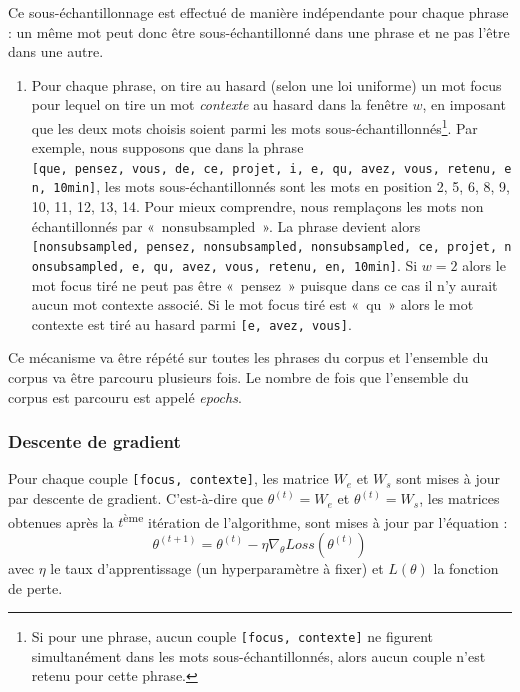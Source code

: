\documentclass[11pt,french,french]{article}
\providecommand{\tightlist}{%
  \setlength{\parskip}{0pt}
  }
\let\rmarkdownfootnote\footnote%
\def\footnote{\protect\rmarkdownfootnote}
\begin{document}
Ce sous-échantillonnage est effectué de manière indépendante pour chaque phrase : un même mot peut donc être sous-échantillonné dans une phrase et ne pas l'être dans une autre.

\begin{enumerate}
\def\labelenumi{\arabic{enumi}.}
\setcounter{enumi}{1}
\tightlist
\item
  Pour chaque phrase, on tire au hasard (selon une loi uniforme) un mot focus pour lequel on tire un mot \emph{contexte} au hasard dans la fenêtre \(w\), en imposant que les deux mots choisis soient parmi les mots sous-échantillonnés\footnote{Si pour une phrase, aucun couple \texttt{{[}focus,\ contexte{]}} ne figurent simultanément dans les mots sous-échantillonnés, alors aucun couple n'est retenu pour cette phrase.}.
  Par exemple, nous supposons que dans la phrase \texttt{{[}que,\ pensez,\ vous,\ de,\ ce,\ projet,\ i,\ e,\ qu,\ avez,\ vous,\ retenu,\ en,\ 10min{]}}, les mots sous-échantillonnés sont les mots en position 2, 5, 6, 8, 9, 10, 11, 12, 13, 14.
  Pour mieux comprendre, nous remplaçons les mots non échantillonnés par «~nonsubsampled~». La phrase devient alors \texttt{{[}nonsubsampled,\ pensez,\ nonsubsampled,\ nonsubsampled,\ ce,\ projet,\ nonsubsampled,\ e,\ qu,\ avez,\ vous,\ retenu,\ en,\ 10min{]}}.
  Si \(w=2\) alors le mot focus tiré ne peut pas être «~pensez~» puisque dans ce cas il n'y aurait aucun mot contexte associé. Si le mot focus tiré est «~qu~» alors le mot contexte est tiré au hasard parmi \texttt{{[}e,\ avez,\ vous{]}}.
\end{enumerate}

Ce mécanisme va être répété sur toutes les phrases du corpus et l'ensemble du corpus va être parcouru plusieurs fois. Le nombre de fois que l'ensemble du corpus est parcouru est appelé \emph{epochs}.

\hypertarget{subsec:descentedegradient}{%
\subsubsection{Descente de gradient}\label{subsec:descentedegradient}}

Pour chaque couple \texttt{{[}focus,\ contexte{]}}, les matrice \(W_e\) et \(W_s\) sont mises à jour par descente de gradient. C'est-à-dire que \(\theta^{(t)} = W_e\) et \(\theta^{(t)} = W_s\), les matrices obtenues après la \(t\)\textsuperscript{ème} itération de l'algorithme, sont mises à jour par l'équation :
\[\theta^{(t+1)} = \theta^{(t)} - \eta \nabla_\theta Loss(\theta^{(t)})\]
avec \(\eta\) le taux d'apprentissage (un hyperparamètre à fixer) et \(L(\theta)\) la fonction de perte.
\end{document}
